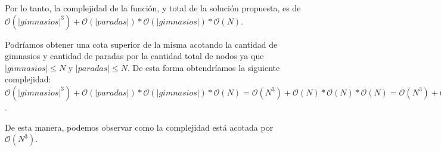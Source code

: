 Por lo tanto, la complejidad de la función, y total de la solución propuesta, es de $\mathcal{O}(|gimnasios|^3) + \mathcal{O}(|paradas|) * \mathcal{O}(|gimnasios|) * \mathcal{O}(N)$.

Podríamos obtener una cota superior de la misma acotando la cantidad de gimnasios y cantidad de paradas por la cantidad total de nodos ya que $|gimnasios| \leq N$ y $|paradas| \leq N$. De esta forma obtendríamos la siguiente complejidad: $\mathcal{O}(|gimnasios|^3) + \mathcal{O}(|paradas|) * \mathcal{O}(|gimnasios|) * \mathcal{O}(N) = \mathcal{O}(N^3) + \mathcal{O}(N) * \mathcal{O}(N) * \mathcal{O}(N) = \mathcal{O}(N^3) + \mathcal{O}(N^3) = \mathcal{O}(N^3)$.

De esta manera, podemos observar como la complejidad está acotada por $\mathcal{O}(N^3)$.





